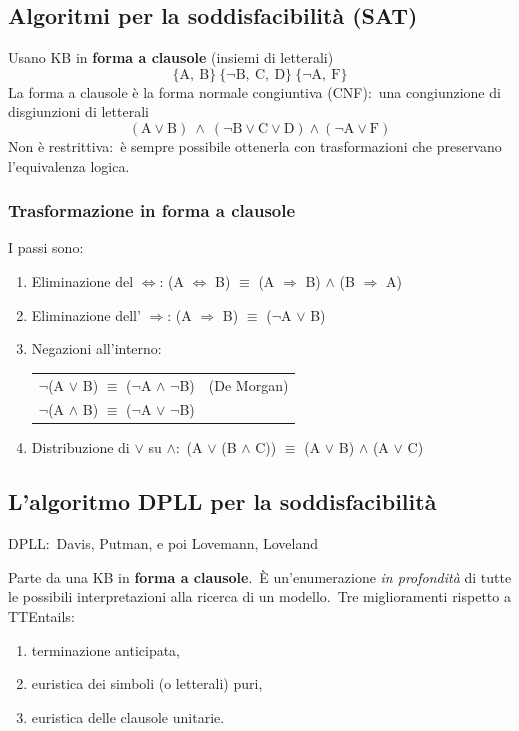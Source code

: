 \subsection{Algoritmi per la soddisfacibilità (SAT)}

Usano KB in \textbf{forma a clausole} (insiemi di letterali)
\[\{\mathrm{A},\ \mathrm{B}\}\ \{\lnot \mathrm{B},\ \mathrm{C},\ \mathrm{D}\}\ \{\lnot \mathrm{A},\ \mathrm{F}\}\]
La forma a clausole è la forma normale congiuntiva (CNF):\ una congiunzione di disgiunzioni di letterali
\[(\mathrm{A} \lor \mathrm{B})\ \land\ (\lnot \mathrm{B} \lor \mathrm{C} \lor \mathrm{D}) \land (\lnot \mathrm{A}  \lor \mathrm{F})\]
Non è restrittiva:\ è sempre possibile ottenerla con trasformazioni che preservano l'equivalenza logica.\

\subsubsection{Trasformazione in forma a clausole}
I passi sono:
\begin{enumerate}
	\item Eliminazione del $\Leftrightarrow$: (A $\Leftrightarrow$ B) $\equiv$ (A $\Rightarrow$ B) $\land$ (B $\Rightarrow$ A)
	\item Eliminazione dell' $\Rightarrow$: (A $\Rightarrow$ B) $\equiv$ ($\lnot$A $\lor$ B)
	\item Negazioni all'interno:
	      \begin{table}[H]
		      \centering
		      \begin{tabular}{l l}
			      $\lnot$(A $\lor$ B) $\equiv$ ($\lnot$A $\land$ $\lnot$B) & (De Morgan) \\
			      $\lnot$(A $\land$ B) $\equiv$ ($\lnot$A $\lor$ $\lnot$B) &             \\
		      \end{tabular}
	      \end{table}
	\item Distribuzione di $\lor$ su $\land$:\ 	(A $\lor$ (B $\land$ C)) $\equiv$ (A $\lor$ B) $\land$ (A $\lor$ C)
\end{enumerate}

\subsection{L'algoritmo DPLL per la soddisfacibilità}

DPLL:\ Davis, Putman, e poi Lovemann, Loveland

Parte da una KB in \textbf{forma a clausole}.\
È un'enumerazione \textit{in profondità} di tutte le possibili interpretazioni alla ricerca di un modello.\
Tre miglioramenti rispetto a TTEntails:
\begin{enumerate}
	\item terminazione anticipata,
	\item euristica dei simboli (o letterali) puri,
	\item euristica delle clausole unitarie.
\end{enumerate}

